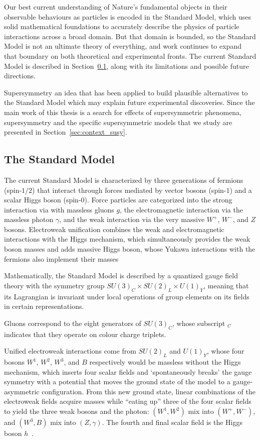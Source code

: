 \noindent Our best current understanding of Nature's fundamental objects in
their observable behaviours as particles is encoded in the Standard Model,
which uses solid mathematical foundations to accurately describe the physics
of particle interactions across a broad domain.
But that domain is bounded, so the Standard Model is not an ultimate theory of
everything, and work continues to expand that boundary on both theoretical and
experimental fronts.
The current Standard Model is described in Section~\ref{sec:context_sm},
along with its limitations and possible future directions.

Supersymmetry an idea that has been applied to build plausible alternatives
to the Standard Model which may explain future experimental discoveries.
Since the main work of this thesis is a search for effects of supersymmetric
phenomena, supersymmetry and the specific supersymmetric models that we study
are presented in Section~\ref{sec:context_susy}.


\subsection{The Standard Model}
\label{sec:context_sm}
The current Standard Model is characterized by three generations of fermions
(spin-$1/2$) that interact through forces mediated by vector bosons
(spin-$1$) and a scalar Higgs boson (spin-$0$).
Force particles are categorized into the strong interaction
via with massless gluons $g$,
the electromagnetic interaction via the massless photon $\gamma$,
and
the weak interaction via the very massive $W^+$, $W^-$, and $Z$ bosons.
Electroweak unification combines the weak and electromagnetic interactions
with the Higgs mechanism, which simultaneously provides the weak boson masses
and adds massive Higgs boson, whose Yukawa interactions with the fermions also
implement their masses~\cite{thomson2013modern}

Mathematically, the Standard Model is described by a quantized gauge field
theory with the symmetry group
$SU\!(3)_C \!\times\! SU\!(2)_L \!\times\! U\!(1)_Y$,
meaning that its Lagrangian is invariant under local operations of group
elements on its fields in certain representations.

Gluons correspond to the eight generators of $SU\!(3)_C$, whose subscript $_C$
indicates that they operate on colour charge triplets.

Unified electroweak interactions come from $SU\!(2)_L$ and $U\!(1)_Y$, whose
four bosons $W^1$, $W^2$, $W^3$, and $B$ respectively would be massless
without the Higgs mechanism, which inserts four scalar fields and
`spontaneously breaks' the gauge symmetry with a potential that moves the
ground state of the model to a gauge-asymmetric configuration.
From this new ground state, linear combinations of the electroweak fields
acquire masses while ``eating up'' three of the four scalar fields to yield
the three weak bosons and the photon:
$(W^1, W^2)$ mix into $(W^+, W^-)$, and $(W^3, B)$ mix into $(Z, \gamma)$.
The fourth and final scalar field is the Higgs boson $h$~\cite{
rubakov1999classical,
cottingham2007greenwood
}.

